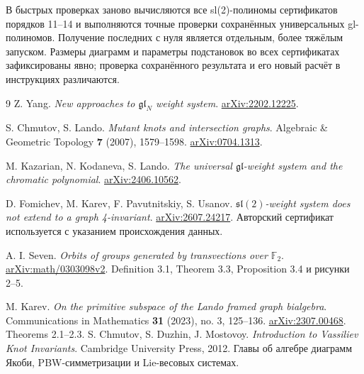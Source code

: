 \documentclass[11pt,a4paper]{article}
\numberwithin{equation}{section}
\theoremstyle{definition}
\theoremstyle{remark}
\begin{document}
В быстрых проверках заново вычисляются все sl(2)-полиномы
сертификатов порядков 11--14 и выполняются точные проверки
сохранённых универсальных gl-полиномов. Получение последних
с нуля является отдельным, более тяжёлым запуском.
Размеры диаграмм и параметры подстановок во всех сертификатах
зафиксированы явно; проверка сохранённого результата и его новый
расчёт в инструкциях различаются.

\begin{thebibliography}{9}
Z. Yang. \emph{New approaches to $\mathfrak{gl}_N$ weight system}.
\href{https://arxiv.org/abs/2202.12225}{arXiv:2202.12225}.

S. Chmutov, S. Lando. \emph{Mutant knots and intersection graphs}.
Algebraic \& Geometric Topology \textbf{7} (2007), 1579--1598.
\href{https://arxiv.org/abs/0704.1313}{arXiv:0704.1313}.

M. Kazarian, N. Kodaneva, S. Lando.
\emph{The universal $\mathfrak{gl}$-weight system and the chromatic polynomial}.
\href{https://arxiv.org/abs/2406.10562}{arXiv:2406.10562}.

D. Fomichev, M. Karev, F. Pavutnitskiy, S. Usanov.
\emph{$\mathfrak{sl}(2)$-weight system does not extend to a graph 4-invariant}.
\href{https://arxiv.org/abs/2607.24217}{arXiv:2607.24217}.
Авторский сертификат используется с указанием происхождения данных.

A. I. Seven. \emph{Orbits of groups generated by transvections over $\mathbb F_2$}.
\href{https://arxiv.org/abs/math/0303098}{arXiv:math/0303098v2}.
Definition 3.1, Theorem 3.3, Proposition 3.4 и рисунки 2--5.

M. Karev. \emph{On the primitive subspace of the Lando framed graph bialgebra}.
Communications in Mathematics \textbf{31} (2023), no. 3, 125--136.
\href{https://arxiv.org/abs/2307.00468}{arXiv:2307.00468}.
Theorems 2.1--2.3.
S. Chmutov, S. Duzhin, J. Mostovoy.
\emph{Introduction to Vassiliev Knot Invariants}.
Cambridge University Press, 2012. Главы об алгебре диаграмм Якоби,
PBW-симметризации и Lie-весовых системах.
\end{thebibliography}
\end{document}
